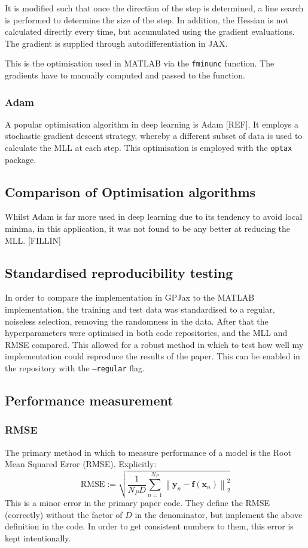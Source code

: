 \documentclass[12pt,a4paper,twoside]{report}
\theoremstyle{definition}
\begin{document}
It is modified such that once the direction of the step is determined, a line search is performed to determine the size of the step. In addition, the Hessian is not calculated directly every time, but accumulated using the gradient evaluations. The gradient is supplied through autodifferentiation in JAX.

This is the optimisation used in MATLAB via the \texttt{fminunc} function. The gradients have to manually computed and passed to the function.

\subsubsection{Adam}
A popular optimisation algorithm in deep learning is Adam [REF]. It employs a stochastic gradient descent strategy, whereby a different subset of data is used to calculate the MLL at each step. This optimisation is employed with the \texttt{optax} package.

\subsection{Comparison of Optimisation algorithms}
Whilst Adam is far more used in deep learning due to its tendency to avoid local minima, in this application, it was not found to be any better at reducing the MLL. [FILLIN]

\subsection{Standardised reproducibility testing}
In order to compare the implementation in GPJax to the MATLAB implementation, the training and test data was standardised to a regular, noiseless selection, removing the randomness in the data. After that the hyperparameters were optimised in both code repositories, and the MLL and RMSE compared. This allowed for a robust method in which to test how well my implementation could reproduce the results of the paper. This can be enabled in the repository with the \texttt{--regular} flag.

\subsection{Performance measurement}\label{performance}
\subsubsection{RMSE}
The primary method in which to measure performance of a model is the Root Mean Squared Error (RMSE)\label{RMSE}. Explicitly:
\begin{equation*}\label{norm}
	\text{RMSE}:=\sqrt{\frac{1}{N_PD}\sum_{n=1}^{N_P}\left\|\mathbf y_n-\mathbf f(\mathbf x_n)\right\|_2^2} 
\end{equation*}
This is a minor error in the primary paper code. They define the RMSE (correctly) without the factor of $D$ in the denominator, but implement the above definition in the code. In order to get consistent numbers to them, this error is kept intentionally.
\end{document}
